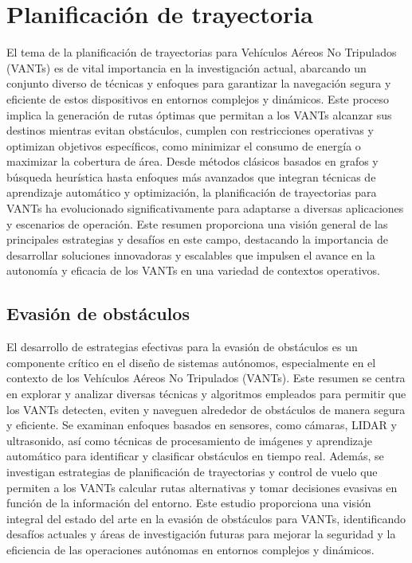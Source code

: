 \section{Planificación de trayectoria}

El tema de la planificación de trayectorias para Vehículos Aéreos No Tripulados (VANTs) es de vital importancia en la investigación actual, abarcando un conjunto diverso de técnicas y enfoques para garantizar la navegación segura y eficiente de estos dispositivos en entornos complejos y dinámicos. Este proceso implica la generación de rutas óptimas que permitan a los VANTs alcanzar sus destinos mientras evitan obstáculos, cumplen con restricciones operativas y optimizan objetivos específicos, como minimizar el consumo de energía o maximizar la cobertura de área. Desde métodos clásicos basados en grafos y búsqueda heurística hasta enfoques más avanzados que integran técnicas de aprendizaje automático y optimización, la planificación de trayectorias para VANTs ha evolucionado significativamente para adaptarse a diversas aplicaciones y escenarios de operación. Este resumen proporciona una visión general de las principales estrategias y desafíos en este campo, destacando la importancia de desarrollar soluciones innovadoras y escalables que impulsen el avance en la autonomía y eficacia de los VANTs en una variedad de contextos operativos.

\subsection{Evasión de obstáculos}

El desarrollo de estrategias efectivas para la evasión de obstáculos es un componente crítico en el diseño de sistemas autónomos, especialmente en el contexto de los Vehículos Aéreos No Tripulados (VANTs). Este resumen se centra en explorar y analizar diversas técnicas y algoritmos empleados para permitir que los VANTs detecten, eviten y naveguen alrededor de obstáculos de manera segura y eficiente. Se examinan enfoques basados en sensores, como cámaras, LIDAR y ultrasonido, así como técnicas de procesamiento de imágenes y aprendizaje automático para identificar y clasificar obstáculos en tiempo real. Además, se investigan estrategias de planificación de trayectorias y control de vuelo que permiten a los VANTs calcular rutas alternativas y tomar decisiones evasivas en función de la información del entorno. Este estudio proporciona una visión integral del estado del arte en la evasión de obstáculos para VANTs, identificando desafíos actuales y áreas de investigación futuras para mejorar la seguridad y la eficiencia de las operaciones autónomas en entornos complejos y dinámicos.

